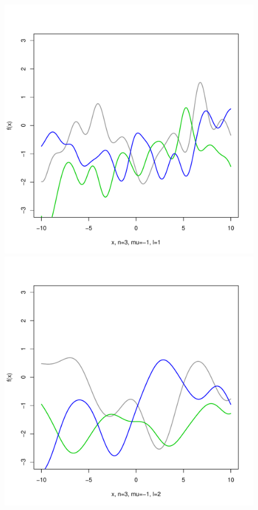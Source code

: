 \documentclass[12pt,letterpaper]{article}
\begin{document}
\begin{figure}
\begin{center}
\includegraphics[scale=0.2]{hw321/n3-m-1-l1.pdf}
\includegraphics[scale=0.2]{hw321/n3-m-1-l2.pdf}

\end{center}
\end{figure}
\end{document}
